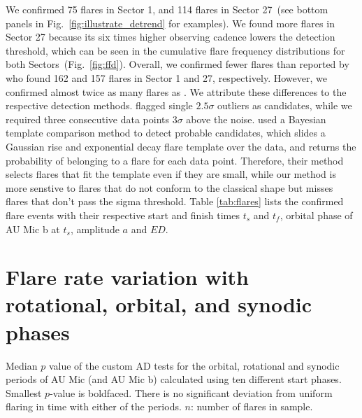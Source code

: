 \documentclass[fleqn,usenatbib,letters]{mnras}%
\begin{document}
We confirmed 75 flares in Sector 1, and 114 flares in Sector 27~(see bottom panels in Fig.~\ref{fig:illustrate_detrend} for examples). We found more flares in Sector 27 because its six times higher observing cadence lowers the detection threshold, which can be seen in the cumulative flare frequency distributions for both Sectors~(Fig.~\ref{fig:ffd}). Overall, we confirmed fewer flares than reported by \citet{martioli2021new} who found 162 and 157 flares in Sector 1 and 27, respectively. However, we confirmed almost twice as many flares as \citet{gilbert2021flares}. We attribute these differences to the respective detection methods. \citet{martioli2021new} flagged single $2.5\sigma$ outliers as candidates, while we required three consecutive data points $3\sigma$ above the noise. \citet{gilbert2021flares} used a Bayesian template comparison method to detect probable candidates, which slides a Gaussian rise and exponential decay flare template over the data, and returns the probability of belonging to a flare for each data point. Therefore, their method selects flares that fit the template even if they are small, while our method is more senstive to flares that do not conform to the classical shape but misses flares that don't pass the sigma threshold. Table \ref{tab:flares} lists the confirmed flare events with their respective start and finish times $t_s$ and $t_f$, orbital phase of AU Mic b at $t_s$, amplitude $a$ and $ED$.

\section{Flare rate variation with rotational, orbital, and synodic phases}
\label{sec:phases}



\begin{table}
\caption{Median $p$ value of the custom AD tests for the orbital, rotational and synodic periods of AU Mic (and AU Mic b) calculated using ten different start phases. Smallest $p$-value is boldfaced. There is no significant deviation from uniform flaring in time with either of the periods. $n$: number of flares in sample.}
\centering

\label{tab:pvals}
\end{table}
\end{document}
